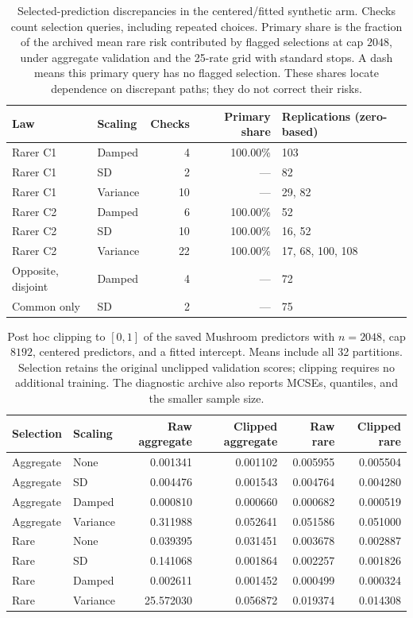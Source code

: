 \begin{table}[ht]
  \centering
  \small
  \begin{tabular}{llrrl}
    \toprule
    Law & Scaling & Checks & Primary share & Replications (zero-based) \\
    \midrule
    Rarer C1 & Damped & 4 & 100.00\% & 103 \\
    Rarer C1 & SD & 2 & --- & 82 \\
    Rarer C1 & Variance & 10 & --- & 29, 82 \\
    Rarer C2 & Damped & 6 & 100.00\% & 52 \\
    Rarer C2 & SD & 10 & 100.00\% & 16, 52 \\
    Rarer C2 & Variance & 22 & 100.00\% & 17, 68, 100, 108 \\
    Opposite, disjoint & Damped & 4 & --- & 72 \\
    Common only & SD & 2 & --- & 75 \\
    \bottomrule
  \end{tabular}
  \caption{
    Selected-prediction discrepancies in the centered/fitted synthetic
    arm. Checks count selection queries, including repeated choices.
    Primary share is the fraction of the archived mean rare risk
    contributed by flagged selections at cap $2048$, under aggregate
    validation and the 25-rate grid with standard stops. A dash
    means this primary query has no flagged selection. These shares
    locate dependence on discrepant paths; they do not correct
    their risks.
  }
  \label{tab:review-audit-impact}
\end{table}

\begin{table}[ht]
  \centering
  \small
  \begin{tabular}{llrrrr}
    \toprule
    Selection & Scaling & Raw aggregate & Clipped aggregate
      & Raw rare & Clipped rare \\
    \midrule
    Aggregate & None & 0.001341 & 0.001102 & 0.005955 & 0.005504 \\
    Aggregate & SD & 0.004476 & 0.001543 & 0.004764 & 0.004280 \\
    Aggregate & Damped & 0.000810 & 0.000660 & 0.000682 & 0.000519 \\
    Aggregate & Variance & 0.311988 & 0.052641 & 0.051586 & 0.051000 \\
    Rare & None & 0.039395 & 0.031451 & 0.003678 & 0.002887 \\
    Rare & SD & 0.141068 & 0.001864 & 0.002257 & 0.001826 \\
    Rare & Damped & 0.002611 & 0.001452 & 0.000499 & 0.000324 \\
    Rare & Variance & 25.572030 & 0.056872 & 0.019374 & 0.014308 \\
    \bottomrule
  \end{tabular}
  \caption{
    Post hoc clipping to $[0,1]$ of the saved Mushroom predictors
    with $n=2048$, cap $8192$,
    centered predictors, and a fitted intercept. Means include all 32
    partitions. Selection retains the original unclipped validation
    scores; clipping requires no additional training. The diagnostic
    archive also reports MCSEs, quantiles, and the smaller sample size.
  }
  \label{tab:review-clipping}
\end{table}
